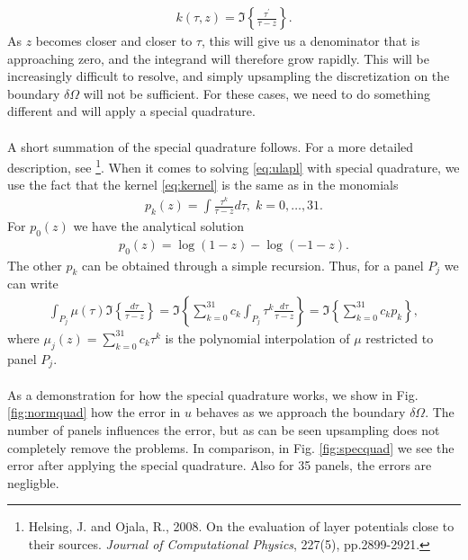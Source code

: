 \documentclass[a4paper,10pt]{article}
\begin{document}
\begin{align}
k(\tau,z) = \Im\left\{ \frac{\tau^\prime}{\tau-z}\right\}.
\label{eq:kernel}
\end{align}
As $z$ becomes closer and closer to $\tau$, this will give us a denominator that is approaching zero, and the integrand will therefore grow rapidly. This will be increasingly difficult to resolve, and simply upsampling the discretization on the boundary $\delta\Omega$ will not be sufficient. For these cases, we need to do something different and will apply a special quadrature.
\\ \\
A short summation of the special quadrature follows. For a more detailed description, see \footnote{Helsing, J. and Ojala, R., 2008. On the evaluation of layer potentials close to their sources. {\em Journal of Computational Physics}, 227(5), pp.2899-2921.}. When it comes to solving \eqref{eq:ulapl} with special quadrature, we use the fact that the kernel \eqref{eq:kernel} is the same as in the monomials 
\begin{align}
    p_k(z) = \int \frac{\tau^k}{\tau-z}d\tau, \; k=0,\hdots,31.
    \label{eq:pkrec}
\end{align}
For $p_0(z)$ we have the analytical solution 
\begin{align}
    p_0(z) = \log(1-z)-\log(-1-z).
    \label{eq:p0}  
\end{align}
The other $p_k$ can be obtained through a simple recursion. Thus, for a panel $P_j$ we can write
\begin{align}
    \int_{P_j} \mu(\tau) \Im\left\{ \frac{d\tau}{\tau-z} \right\} = \Im\left\{ \sum_{k=0}^{31} c_k \int_{P_j} \tau^k\frac{d\tau}{\tau-z} \right\} = \Im\left\{ \sum_{k=0}^{31} c_kp_k \right\},
    \label{eq:specQ}
\end{align}
where $\mu_j(z) = \sum_{k=0}^{31} c_k\tau^k$ is the polynomial interpolation of $\mu$ restricted to panel $P_j$. 
\\ \\
As a demonstration for how the special quadrature works, we show in Fig. \ref{fig:normquad} how the error in $u$ behaves as we approach the boundary $\delta\Omega$. The number of panels influences the error, but as can be seen upsampling does not completely remove the problems. In comparison, in Fig. \ref{fig:specquad} we see the error after applying the special quadrature. Also for 35 panels, the errors are negligble. 
\end{document}
